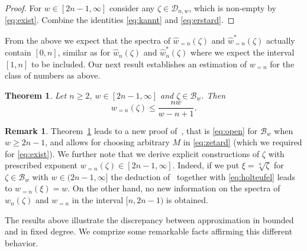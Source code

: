 \documentclass[12pt]{amsart}
\newtheorem{theorem}{Theorem}[section]
\theoremstyle{definition}
\newtheorem{remark}{Remark}
\begin{document}
\begin{proof}
For $w\in[2n-1,\infty]$
consider any $\zeta\in\mathscr{D}_{n,w}$, which is non-empty by \eqref{eq:exist}. 
Combine the identities \eqref{eq:kannt} and \eqref{eq:erstard}.
\end{proof}

From the above we expect
that the spectra of $\widehat{w}_{=n}(\zeta)$ and $\widehat{w}_{=n}^{\ast}(\zeta)$ actually
contain $[0,n]$, similar as for $\widehat{w}_{n}(\zeta)$ 
and $\widehat{w}_{n}^{\ast}(\zeta)$ where
we expect the interval $[1,n]$ to be included. 
Our next result establishes an estimation of $w_{=n}$ for the class of numbers as above.

\begin{theorem} \label{liouspez}
Let $n\geq 2$, $w\in[2n-1,\infty]$ and $\zeta\in\mathscr{B}_{w}$. Then
%
\begin{equation} \label{eq:holteufel}
w_{=n}(\zeta)\leq \frac{nw}{w-n+1}.
\end{equation}
%
\end{theorem}

\begin{remark}
Theorem~\ref{liouspez}  
leads to a new proof of~\cite[Corollary~1]{bug}, that is
\eqref{eq:open} for $\mathscr{B}_{w}$ when $w\geq 2n-1$,
and allows for choosing arbitrary $M$ in \eqref{eq:zetard} (which
we required for \eqref{eq:exist}). We further note that we derive explicit constructions of $\zeta$ with prescribed 
exponent $w_{=n}(\zeta)\in[2n-1,\infty]$.
Indeed, if we put $\xi=\sqrt[n]{\zeta}$ for 
$\zeta\in\mathscr{B}_{w}$ with $w\in(2n-1,\infty]$
the deduction of~\cite[Theorem~1]{bug} together
with \eqref{eq:holteufel} leads to $w_{=n}(\xi)=w$.
On the other hand, no new information on the spectra of
$w_{n}(\zeta)$ and $w_{=n}$ in the interval $[n,2n-1)$ is obtained.
\end{remark}

The results above
illustrate the discrepancy between approximation in 
bounded and in fixed degree. We comprize some remarkable 
facts affirming this different behavior.
\end{document}
